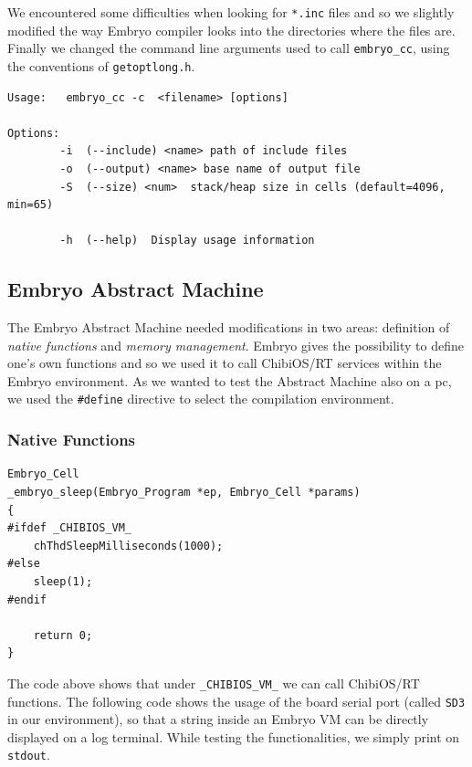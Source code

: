 \documentclass[a4paper,10pt]{article}
\begin{document}
\begin{multicols}{2}
\begin{lstlisting}[caption={include directives in Embryo}]
\end{lstlisting}
We encountered some difficulties when looking for \texttt{*.inc} files and so we slightly modified the way Embryo compiler looks into the directories where the files are.\newline
Finally we changed the command line arguments used to call \texttt{embryo\_cc}, using the conventions of \texttt{getoptlong.h}.
\medskip
\lstset{language=bash}
\begin{lstlisting}[caption={Command line arguments}]
Usage:   embryo_cc -c  <filename> [options]

Options:
        -i  (--include) <name> path of include files
        -o  (--output) <name> base name of output file
        -S  (--size) <num>  stack/heap size in cells (default=4096, min=65)

        -h  (--help)  Display usage information
\end{lstlisting}


\subsection{Embryo Abstract Machine}

The Embryo Abstract Machine needed modifications in two areas: definition of \textit{native functions} and \textit{memory management}. Embryo gives the possibility to define one's own functions and so we used it to call ChibiOS/RT services within the Embryo environment. As we wanted to test the Abstract Machine also on a pc, we used the \texttt{\#define} directive to select the compilation environment.

\subsubsection{Native Functions}
\lstset{language=C}
\begin{lstlisting}[caption={Native function \textit{sleep}}]
Embryo_Cell
_embryo_sleep(Embryo_Program *ep, Embryo_Cell *params)
{
#ifdef _CHIBIOS_VM_
	chThdSleepMilliseconds(1000);
#else
	sleep(1);
#endif

	return 0;
}
\end{lstlisting}
\bigskip
The code above shows that under \texttt{\_CHIBIOS\_VM\_} we can call ChibiOS/RT functions.\newline
The following code shows the usage of the board serial port (called \texttt{SD3} in our environment), so that a string inside an Embryo VM can be directly displayed on a log terminal. While testing the functionalities, we simply print on \texttt{stdout}.


\end{multicols}
\end{document}
